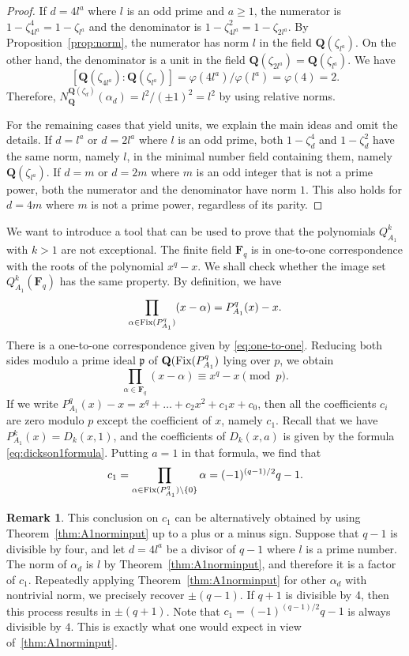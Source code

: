 \documentclass{amsart}
\newcommand{\mf}{\mathfrak}
\newcommand{\Q}{\mathbf Q}
\newcommand{\F}{\mathbf F}
\newcommand{\Fix}{\textnormal{Fix}}
\newcommand{\cycl}[1]{\Q(\zeta_{#1})}
\numberwithin{equation}{section}
\theoremstyle{plain}
\theoremstyle{definition}
\newtheorem{remark}[theorem]{Remark}
\begin{document}
\begin{proof}
If $d=4l^a$ where $l$ is an odd prime and $a\geq1$, the numerator is $1-\zeta_{4l^a}^4 = 1-\zeta_{l^a}$ and the denominator is $1-\zeta_{4l^a}^2 = 1-\zeta_{2l^a}$. By Proposition~\ref{prop:norm}, the numerator has norm $l$ in the field $\cycl{l^a}$. On the other hand, the denominator is a unit in the field $\cycl{2l^a}=\cycl{l^a}$. We have
$$[\cycl{4l^a}:\cycl{l^a}] = \varphi(4l^a)/\varphi(l^a) = \varphi(4) = 2.$$
Therefore, $N_{\Q}^{\cycl{d}}(\alpha_d) = l^2/(\pm 1)^2 = l^2$ by using relative norms.
	
For the remaining cases that yield units, we explain the main ideas and omit the details. If $d=l^a$ or $d=2l^a$ where $l$ is an odd prime, both $1-\zeta_d^4$ and $1-\zeta_d^2$ have the same norm, namely $l$, in the minimal number field containing them, namely $\cycl{l^a}$. If $d=m$ or $d=2m$ where $m$ is an odd integer that is not a prime power, both the numerator and the denominator have norm $1$. This also holds for $d=4m$ where $m$ is not a prime power, regardless of its parity.
\end{proof}

We want to introduce a tool that can be used to prove that the polynomials $Q_{A_1}^k$ with $k>1$ are not exceptional. The finite field $\F_q$ is in one-to-one correspondence with the roots of the polynomial $x^q-x$. We shall check whether the image set $Q_{A_1}^k(\F_q)$ has the same property. By definition, we have 
\begin{equation*}
	\prod\limits_{\alpha\in\Fix(P_{A_1}^q)}(x-\alpha)=P_{A_1}^q(x)-x.    
\end{equation*}
There is a one-to-one correspondence given by \eqref{eq:one-to-one}. Reducing both sides modulo a prime ideal $\mf{p}$ of $\Q(\Fix(P_{A_1}^q)$ lying over $p$, we obtain 
$$\prod\limits_{\alpha\in\F_q}(x-\alpha)\equiv x^q-x\pmod{p}.$$
If we write $P_{A_1}^q(x)-x = x^q+ \ldots+ c_2x^2+ c_1x+ c_0$, then all the coefficients $c_i$ are zero modulo $p$ except the coefficient of $x$, namely $c_1$. Recall that we have $P_{A_1}^k(x) = D_k(x,1)$, and the coefficients of $D_{k}(x, a)$ is given by the formula \eqref{eq:dickson1formula}. Putting $a=1$ in that formula, we find that
\begin{equation}\label{eq:prodfixpoints}
	c_1 = \prod\limits_{\alpha\in\Fix(P_{A_1}^q) \setminus\{0\}} \alpha= (-1)^{(q-1)/2}q-1.
\end{equation}

\begin{remark}\label{rm:coef}
This conclusion on $c_1$ can be alternatively obtained by using Theorem~\ref{thm:A1norminput} up to a plus or a minus sign. Suppose that $q-1$ is divisible by four, and let $d=4l^a$ be a divisor of $q-1$ where $l$ is a prime number. The norm of $\alpha_d$ is $l$ by Theorem~\ref{thm:A1norminput}, and therefore it is a factor of $c_1$. Repeatedly applying Theorem~\ref{thm:A1norminput} for other $\alpha_d$ with nontrivial norm, we precisely recover $\pm(q-1)$. If $q+1$ is divisible by 4, then this process results in $\pm(q+1)$. Note that $c_1=(-1)^{(q-1)/2}q-1$ is always divisible by $4$. This is exactly what one would expect in view of~\ref{thm:A1norminput}.
\end{remark}
\end{document}
